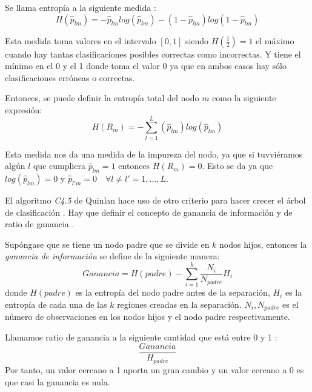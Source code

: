 \begin{defi}
Se llama entropía a la siguiente medida :
\begin{equation}
H(\hat{p}_{lm})=-\hat{p}_{lm}log(\hat{p}_{lm})-(1-\hat{p}_{lm})log(1-\hat{p}_{lm})
\end{equation}

\noindent Esta medida toma valores en el intervalo $[0,1]$ siendo $H(\frac{1}{2})=1$ el máximo cuando hay tantas clasificaciones posibles correctas como incorrectas. Y tiene el mínimo en el 0 y el 1 donde toma el valor 0 ya que en ambos casos hay sólo clasificaciones erróneas o correctas.

\noindent Entonces, se puede definir la entropía total del nodo $m$ como la siguiente expresión:
\begin{equation}
H(R_m)=-\sum_{l=1}^L(\hat{p}_{lm})log(\hat{p}_{lm})
\end{equation}

\noindent Esta medida nos da una medida de la impureza del nodo, ya que si tuvviéramos algún $l$ que cumpliera $\hat{p}_{lm}=1$ entonces $H(R_m)=0$. Esto se da ya que $log(\hat{p}_{lm})=0$ y $\hat{p}_{l'm}=0 \quad \forall l\neq l' =1,\ldots, L$.
\end{defi}

\noindent El algoritmo \emph{C4.5} de Quinlan   hace uso de otro criterio para hacer crecer el árbol de clasificación \cite{Quinlan 2014}. Hay que definir el concepto de ganancia de información y de ratio de ganancia \cite{Brown 2004}.

\begin{defi}
Supóngase que se tiene un nodo padre que se divide en $k$ nodos hijos, entonces la \emph{ganancia de información } se define de la siguiente manera: 
\begin{equation}
Ganancia=H(padre)-\sum_{i=1}^k \dfrac{N_i}{N_{padre}}H_i
\end{equation}
\noindent donde $H(padre)$ es la entropía del nodo padre antes de la separación,  $H_i$ es la entropía de cada una de las $k$  regiones creadas en la separación. $N_i, N_{padre}$ es el número de observaciones en  los nodos hijos y el nodo padre respectivamente. 
\end{defi}

\begin{defi}
Llamamos ratio de ganancia a la siguiente cantidad que está entre 0 y 1 :
\begin{equation}
\dfrac{Ganancia}{H_{padre}}
\end{equation}
Por tanto, un valor cercano a 1  aporta un gran cambio y un valor cercano a 0 es que casi la ganancia es nula.   
\end{defi}


